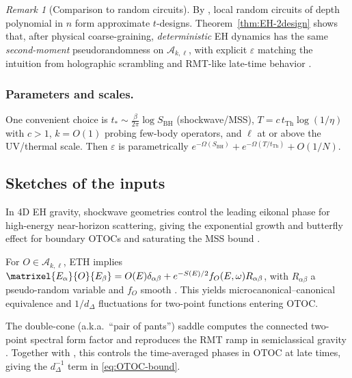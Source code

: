 \documentclass[11pt,a4paper]{article}
\theoremstyle{plain}
\theoremstyle{definition}
\theoremstyle{remark}
\newtheorem{remark}[theorem]{Remark}
\begin{document}
\begin{remark}[Comparison to random circuits]
By \cite{Brandao:2016}, local random circuits of depth polynomial in $n$ form approximate $t$-designs.  Theorem~\ref{thm:EH-2design} shows that, after physical coarse-graining, {\em deterministic} EH dynamics has the same {\em second-moment} pseudorandomness on $\mathscr{A}_{k,\ell}$, with explicit $\varepsilon$ matching the intuition from holographic scrambling and RMT-like late-time behavior \cite{SaadShenkerStanford2019,Cotler:2017}.
\end{remark}

\subsubsection{Parameters and scales.}  One convenient choice is $t_\ast\sim \frac{\beta}{2\pi}\log S_{\mathrm{BH}}$ (shockwave/MSS), $T=c\, t_{\mathrm{Th}} \log(1/\eta)$ with $c>1$, $k=O(1)$ probing few-body operators, and $\ell$ at or above the UV/thermal scale.  Then $\varepsilon$ is parametrically $e^{-\Omega(S_{\mathrm{BH}})} + e^{-\Omega(T/t_{\mathrm{Th}})} + O(1/N)$.

\subsection*{Sketches of the inputs}
 In 4D EH gravity, shockwave geometries control the leading eikonal phase for high-energy near-horizon scattering, giving the exponential growth and butterfly effect for boundary OTOCs and saturating the MSS bound \cite{Maldacena:2016,ShenkerStanford:2014}.

 For $O\in\mathscr{A}_{k,\ell}$, ETH implies
$\matrixel{E_\alpha}{O}{E_\beta} = O(E)\delta_{\alpha\beta} + e^{-S(E)/2} f_O(E,\omega) R_{\alpha\beta}$, with $R_{\alpha\beta}$ a pseudo-random variable and $f_O$ smooth \cite{DAlessioKafriPolkovnikovRigol2016}.  This yields microcanonical--canonical equivalence and $1/d_\Delta$ fluctuations for two-point functions entering $\mathrm{OTOC}$.

 The double-cone (a.k.a.\ ``pair of pants'') saddle computes the connected two-point spectral form factor and reproduces the RMT ramp in semiclassical gravity \cite{SaadShenkerStanford2019}.  Together with \cite{Cotler:2017}, this controls the time-averaged phases in $\mathrm{OTOC}$ at late times, giving the $d_\Delta^{-1}$ term in \eqref{eq:OTOC-bound}.
\end{document}
